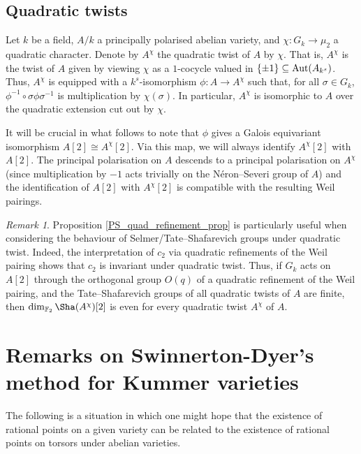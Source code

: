 \documentclass[10pt]{amsart}
\numberwithin{equation}{section}
\theoremstyle{remark}
\newtheorem{remark}[equation]{Remark}
\theoremstyle{definition}
\theoremstyle{definition}
\theoremstyle{definition}
\theoremstyle{definition}
\theoremstyle{definition}
\theoremstyle{definition}
\theoremstyle{definition}
\theoremstyle{definition}
\begin{document}
\subsection{Quadratic twists}
Let $k$ be a field, $A/k$ a principally polarised abelian variety, and $\chi: G_k \to \mu_2$ a quadratic character. Denote by $A^\chi$ the quadratic twist of $A$ by $\chi$. That is,  $A^\chi$ is the twist of $A$ given by viewing $\chi$ as a $1$-cocycle valued in $\{\pm 1\}\subseteq \textup{Aut}(A_{k^s})$. Thus, $A^\chi$ is equipped with a $k^s$-isomorphism $\phi:A\to A^\chi$ such that, for all $\sigma \in G_k$, $\phi^{-1}\circ \sigma \phi \sigma^{-1}$ is multiplication by $\chi(\sigma)$. In particular, $A^\chi$ is isomorphic to $A$ over the quadratic extension cut out by $\chi$.  

It will be crucial in what follows to note that $\phi$ gives a Galois equivariant isomorphism $A[2]\cong A^\chi[2]$. Via this map, we will always identify $A^\chi[2]$ with $A[2]$. The principal polarisation on $A$ descends to a principal polarisation on $A^\chi$ (since multiplication by $-1$ acts trivially on the N\'{e}ron--Severi group of $A$) and the identification of $A[2]$ with $A^\chi[2]$ is compatible with the resulting Weil pairings. 

\begin{remark}
Proposition \ref{PS_quad_refinement_prop} is particularly useful when considering the behaviour of Selmer/Tate--Shafarevich groups under quadratic twist. Indeed, the interpretation of $c_2$ via quadratic refinements of the Weil pairing shows that $c_2$ is invariant under quadratic twist. Thus, if $G_k$ acts on $A[2]$ through the orthogonal group $O(q)$ of a quadratic refinement of the Weil pairing, and the Tate--Shafarevich groups of all quadratic twists of $A$ are finite, then  $\dim_{\mathbb{F}_2}\Sha(A^\chi)[2]$ is even for every quadratic twist $A^\chi$ of $A$. 
\end{remark}

\section{Remarks on Swinnerton-Dyer's method for Kummer varieties}


The following is a situation in which one might hope that the existence of rational points on a given variety can be related to the existence of rational points on torsors under abelian varieties.
 
\end{document}
